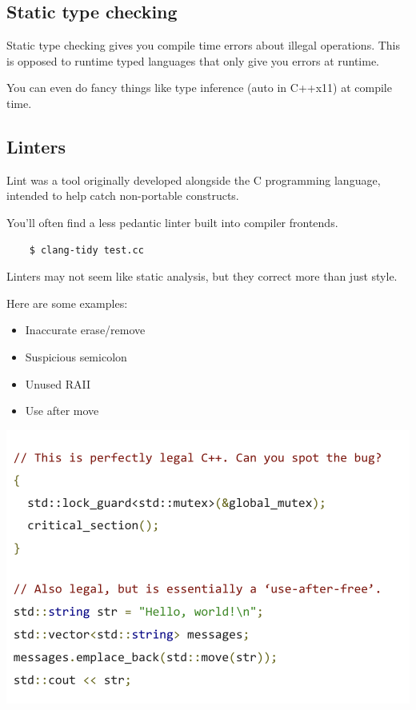 \documentclass{article}
\begin{document}
\subsection{Static type checking}

Static type checking gives you compile time errors about illegal operations. This is opposed to runtime typed languages that only give you errors at runtime.

You can even do fancy things like type inference (auto in C++x11) at compile time.

\subsection{Linters}

Lint was a tool originally developed alongside the C programming language,  intended to help catch non-portable constructs.

You'll often find a less pedantic linter built into compiler frontends.

\begin{verbatim}
    $ clang-tidy test.cc
\end{verbatim}

Linters may not seem like static analysis, but they correct more than just style.

Here are some examples:
\begin{itemize}
    \item Inaccurate erase/remove 
    \item Suspicious semicolon 
    \item Unused RAII 
    \item Use after move 
\end{itemize}

\begin{center}
    \includegraphics*[width=0.7\linewidth]{linter.png}
\end{center}
\end{document}
